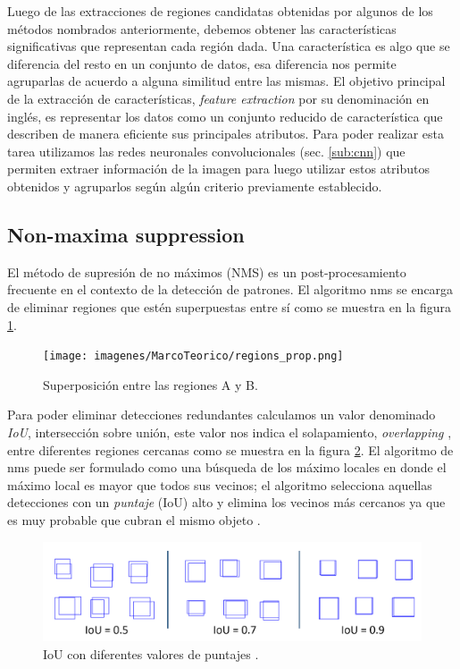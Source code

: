 Luego de las extracciones de regiones candidatas obtenidas por algunos de los métodos nombrados anteriormente, debemos obtener las características significativas que representan cada región dada. Una  característica es algo que se diferencia del resto en un conjunto de datos, esa diferencia nos permite agruparlas de acuerdo a alguna similitud entre las mismas. El objetivo principal de la  extracción de características, \textit{feature extraction} por su denominación en inglés, es representar los datos como un conjunto reducido de característica que describen de manera eficiente sus principales atributos. Para poder realizar esta tarea utilizamos  las redes neuronales convolucionales (sec. \ref{sub:cnn}) que  permiten extraer información de la imagen para luego utilizar estos atributos obtenidos y agruparlos según algún criterio previamente establecido. 




\subsection{Non-maxima suppression}\label{sub:nonmaximumsuppression}

El método de supresión de no máximos (NMS) es un post-procesamiento frecuente en el contexto de la detección de patrones. El algoritmo  \ac{nms} se encarga de eliminar regiones que estén superpuestas entre sí como se muestra en la figura  \ref{Fig: overlapping}.

\begin{figure}[H]
 \centering
  \texttt{[image: imagenes/MarcoTeorico/regions\_prop.png]}
  \caption{Superposición entre las regiones A y B.} \label{Fig: overlapping}
\end{figure}

Para poder eliminar detecciones redundantes calculamos un valor denominado  \textit{IoU}, intersección sobre unión,  este valor nos indica el solapamiento, \textit{overlapping} ,  entre diferentes regiones cercanas como se muestra en la figura \ref{Fig: interseccion}. El algoritmo de \ac{nms} puede ser formulado como una búsqueda de los máximo locales en donde el máximo local es  mayor que todos sus vecinos; el algoritmo selecciona aquellas detecciones con un \textit{puntaje} (IoU) alto y elimina los vecinos más cercanos ya que es muy probable que cubran el mismo objeto \citep{nms2}.

\begin{figure}[H]
 \centering
  \includegraphics[scale=0.3,keepaspectratio=true,clip=true]{imagenes/MarcoTeorico/overlapping.png}
  \caption{IoU con diferentes valores de puntajes \citep{bishop}.}\label{Fig: interseccion}
\end{figure}


